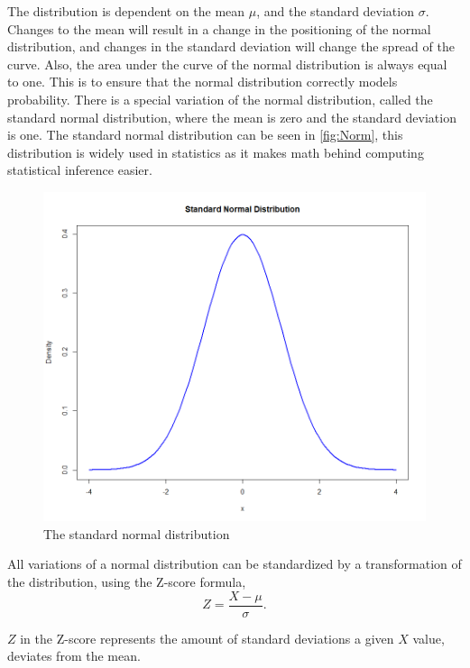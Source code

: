 \noindent The distribution is dependent on the mean $\mu$, and the standard deviation $\sigma$. Changes to the mean will result in a change in the positioning of the normal distribution, and changes in the standard deviation will change the spread of the curve. Also, the area under the curve of the normal distribution is always equal to one. This is to ensure that the normal distribution correctly models probability. There is a special variation of the normal distribution, called the standard normal distribution, where the mean is zero and the standard deviation is one. The standard normal distribution can be seen in \autoref{fig:Norm}, this distribution is widely used in statistics as it makes math behind computing statistical inference easier.
\begin{figure}[h!]
	\centering
	\begin{minipage}{0.80\textwidth}
		\centering
		\includegraphics[width=\linewidth]{billder/Normal distribution.png}
		\caption{The standard normal distribution}
		\label{fig:Norm}
	\end{minipage}\hfill
\end{figure}
All variations of a normal distribution can be standardized by a transformation of the distribution, using the Z-score formula,
\newline
\begin{equation}
Z=\frac{X-\mu}{\sigma}.
\end{equation}


\noindent $Z$ in the Z-score represents the amount of standard deviations a given $X$ value, deviates from the mean.

